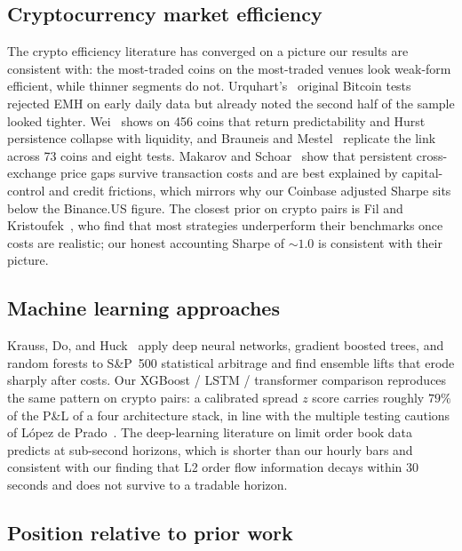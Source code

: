 \documentclass[11pt]{article}
\begin{document}
\subsection{Cryptocurrency market efficiency}
\label{sec:related-crypto}

The crypto efficiency literature has converged on a picture our results are consistent
with: the most-traded coins on the most-traded venues look weak-form efficient, while
thinner segments do not. Urquhart's~\cite{urquhart2016inefficiency} original Bitcoin tests
rejected EMH on early daily data but already noted the second half of the sample looked
tighter. Wei~\cite{wei2018liquidity} shows on 456 coins that return predictability and
Hurst persistence collapse with liquidity, and Brauneis and Mestel~\cite{brauneis2018price}
replicate the link across 73 coins and eight tests. Makarov and
Schoar~\cite{makarov2020trading} show that persistent cross-exchange price gaps survive
transaction costs and are best explained by capital-control and credit frictions, which
mirrors why our Coinbase adjusted Sharpe sits below the Binance.US figure. The closest
prior on crypto pairs is Fil and Kristoufek~\cite{fil2020pairs}, who find that most
strategies underperform their benchmarks once costs are realistic; our honest accounting
Sharpe of $\sim$$1.0$ is consistent with their picture.

\subsection{Machine learning approaches}
\label{sec:related-ml}

Krauss, Do, and Huck~\cite{krauss2017deep} apply deep neural networks, gradient boosted
trees, and random forests to S\&P~500 statistical arbitrage and find ensemble lifts that
erode sharply after costs. Our XGBoost / LSTM / transformer comparison reproduces the same
pattern on crypto pairs: a calibrated spread $z$ score carries roughly $79\%$ of the P\&L of
a four architecture stack, in line with the multiple testing cautions of L\'opez de
Prado~\cite{lopezdeprado2018advances}. The deep-learning literature on limit order book
data predicts at sub-second horizons, which is shorter than our hourly bars and consistent
with our finding that L2 order flow information decays within $30$ seconds and does not
survive to a tradable horizon.

\subsection{Position relative to prior work}
\label{sec:related-novelty}
\end{document}

